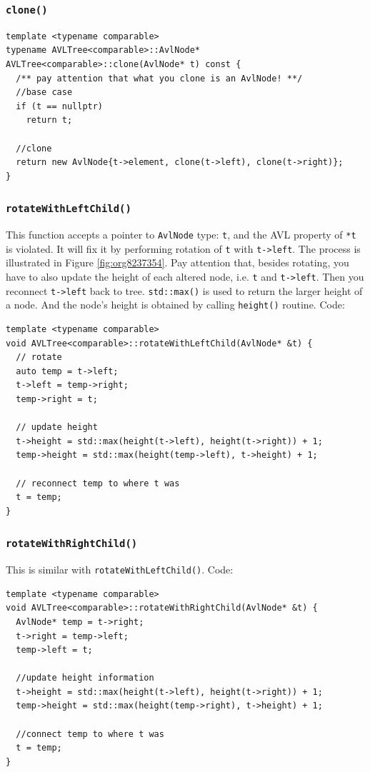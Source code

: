 \documentclass[11pt]{book}
\begin{document}
\subsubsection{\texttt{clone()}}
\label{sec:org2aee1cd}
\begin{verbatim}
template <typename comparable>
typename AVLTree<comparable>::AvlNode* AVLTree<comparable>::clone(AvlNode* t) const {
  /** pay attention that what you clone is an AvlNode! **/
  //base case 
  if (t == nullptr)
    return t;

  //clone 
  return new AvlNode{t->element, clone(t->left), clone(t->right)};
}
\end{verbatim}
\subsubsection{\texttt{rotateWithLeftChild()}}
\label{sec:orga353f6e}
This function accepts a pointer to \texttt{AvlNode} type: \texttt{t}, and the AVL property of \texttt{*t} is violated. It will fix it by performing rotation of \texttt{t} with \texttt{t->left}. The process is illustrated in Figure \ref{fig:org8237354}. Pay attention that, besides rotating, you have to also update the height of each altered node, i.e. \texttt{t} and \texttt{t->left}. Then you reconnect \texttt{t->left} back to tree. \texttt{std::max()} is used to return the larger height of a node. And the node's height is obtained by calling \texttt{height()} routine.
Code:
\begin{verbatim}
template <typename comparable>
void AVLTree<comparable>::rotateWithLeftChild(AvlNode* &t) {
  // rotate
  auto temp = t->left;
  t->left = temp->right;
  temp->right = t;

  // update height
  t->height = std::max(height(t->left), height(t->right)) + 1;
  temp->height = std::max(height(temp->left), t->height) + 1;

  // reconnect temp to where t was
  t = temp;
}
\end{verbatim}
\subsubsection{\texttt{rotateWithRightChild()}}
\label{sec:orgd0d404d}
This is similar with \texttt{rotateWithLeftChild()}. Code:
\begin{verbatim}
template <typename comparable>
void AVLTree<comparable>::rotateWithRightChild(AvlNode* &t) {
  AvlNode* temp = t->right;
  t->right = temp->left;
  temp->left = t;

  //update height information
  t->height = std::max(height(t->left), height(t->right)) + 1;
  temp->height = std::max(height(temp->right), t->height) + 1;

  //connect temp to where t was
  t = temp;
}
\end{verbatim}
\end{document}
